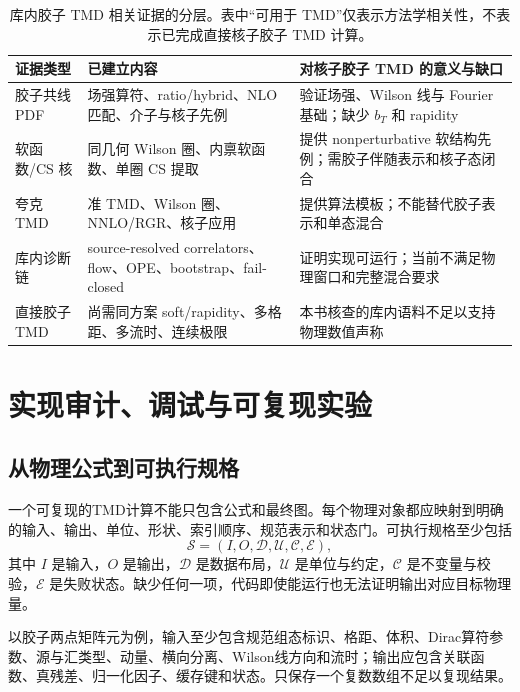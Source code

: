 \documentclass[UTF8,12pt,a4paper,twoside,openany]{ctexbook}
\begin{document}
\begin{table}[htbp]
\centering
\caption{库内胶子 TMD 相关证据的分层。表中“可用于 TMD”仅表示方法学相关性，不表示已完成直接核子胶子 TMD 计算。}
\label{tab:evidence}
\small
\begin{tabularx}{\textwidth}{L{3.1cm}L{2.7cm}Y}
\toprule
证据类型 & 已建立内容 & 对核子胶子 TMD 的意义与缺口 \\
\midrule
胶子共线 PDF & 场强算符、ratio/hybrid、NLO 匹配、介子与核子先例 & 验证场强、Wilson 线与 Fourier 基础；缺少 \(b_T\) 和 rapidity \\
软函数/CS 核 & 同几何 Wilson 圈、内禀软函数、单圈 CS 提取 & 提供 nonperturbative 软结构先例；需胶子伴随表示和核子态闭合 \\
夸克 TMD & 准 TMD、Wilson 圈、NNLO/RGR、核子应用 & 提供算法模板；不能替代胶子表示和单态混合 \\
库内诊断链 & source-resolved correlators、flow、OPE、bootstrap、fail-closed & 证明实现可运行；当前不满足物理窗口和完整混合要求 \\
直接胶子 TMD & 尚需同方案 soft/rapidity、多格距、多流时、连续极限 & 本书核查的库内语料不足以支持物理数值声称 \\
\bottomrule
\end{tabularx}
\end{table}

\clearpage
\chapter{实现审计、调试与可复现实验}
\label{sec:implementation-audit}

\section{从物理公式到可执行规格}

一个可复现的TMD计算不能只包含公式和最终图。每个物理对象都应映射到明确的输入、输出、单位、形状、索引顺序、规范表示和状态门。可执行规格至少包括
\begin{equation}
  \mathcal S=
  (I,O,\mathcal D,\mathcal U,\mathcal C,\mathcal E),
  \label{eq:executable-spec}
\end{equation}
其中 \(I\) 是输入，\(O\) 是输出，\(\mathcal D\) 是数据布局，\(\mathcal U\) 是单位与约定，\(\mathcal C\) 是不变量与校验，\(\mathcal E\) 是失败状态。缺少任何一项，代码即使能运行也无法证明输出对应目标物理量。

以胶子两点矩阵元为例，输入至少包含规范组态标识、格距、体积、Dirac算符参数、源与汇类型、动量、横向分离、Wilson线方向和流时；输出应包含关联函数、真残差、归一化因子、缓存键和状态。只保存一个复数数组不足以复现结果。
\end{document}
